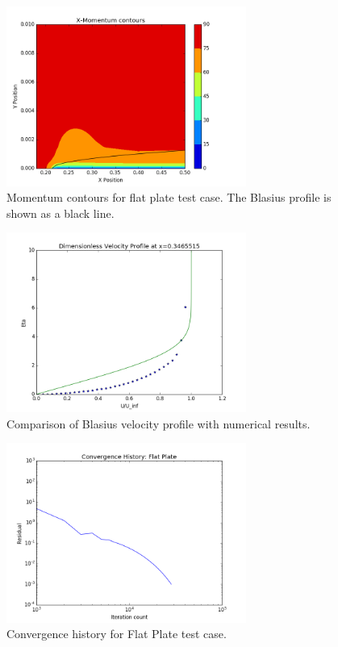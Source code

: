 \documentclass{article}
\begin{document}
\begin{figure}[!ht]
\centering
\includegraphics[width=0.7\textwidth]{images/plate_contour.png}
\caption{Momentum contours for flat plate test case. The Blasius profile is shown as a black line.}
\label{fig:plate_contour}
\end{figure}

\newpage
\begin{figure}[!ht]
\centering
\includegraphics[width=0.7\textwidth]{images/plate_profile.png}
\caption{Comparison of Blasius velocity profile with numerical results.}
\label{fig:plate_profile}
\end{figure}

\begin{figure}[!ht]
\centering
\includegraphics[width=0.7\textwidth]{images/plate_convergence.png}
\caption{Convergence history for Flat Plate test case.}
\label{fig:plate_convergence}
\end{figure}
\end{document}
